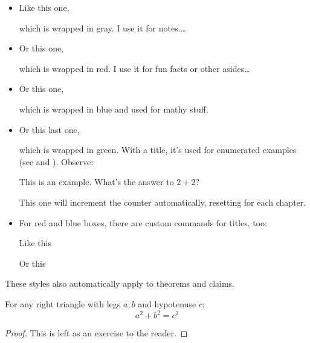 \documentclass[letterpaper,12pt,notitlepage,twoside]{report}
\begin{document}
%
\begin{itemize}
  \item Like this one,
    \begin{notebox}
      which is wrapped in gray. I use it for notes.\ldots
    \end{notebox}

  \item Or this one,
    \begin{funfact}
      which is wrapped in red. I use it for fun facts or other asides\ldots
    \end{funfact}

  \item Or this one,
    \begin{mathaside}
      which is wrapped in blue and used for mathy stuff.
    \end{mathaside}

  \item Or this last one,
    \begin{example}
      which is wrapped in green. With a title, it's used for enumerated examples
      (see  and ).
      Observe:
    \end{example}

    \begin{example}[frametitle=\extitle{Test}]
      This is an example. What's the answer to $2+2$?
    \end{example}

    \begin{example}[frametitle=\extitle{Test Again}]
      This one will increment the counter automatically, resetting for each
      chapter.
    \end{example}


  \item For red and blue boxes, there are custom commands for titles, too:
    \begin{mathaside}[frametitle=\mathtitle{One Title}]
      Like this
    \end{mathaside}
    \begin{mathaside}[frametitle=\mathtitlep{Two Titles}{A Subtitle}]
      Or this
    \end{mathaside}
\end{itemize}

\hr{5in}

These styles also automatically apply to theorems and claims.

\begin{theorem}
  \label{thm:pyth}
  For any right triangle with legs $a,b$ and hypotenuse $c$:
  \begin{equation}
    \label{eq:pyth}
    a^2+b^2=c^2
  \end{equation}
\end{theorem}
\begin{proof}
  This is left as an exercise to the reader.
\end{proof}
\end{document}
